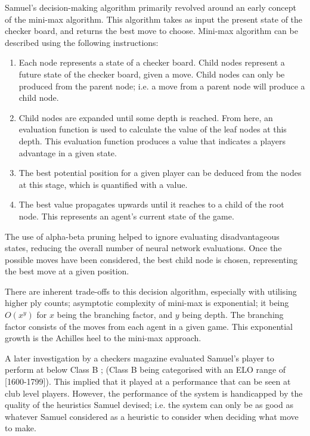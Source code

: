 \documentclass[12pt,a4paper]{article}
\begin{document}
        Samuel's decision-making algorithm primarily revolved around an early concept of the mini-max algorithm. This algorithm takes as input the present state of the checker board, and returns the best move to choose. Mini-max algorithm can be described using the following instructions:
        
        \begin{enumerate}
            \item Each node represents a state of a checker board. Child nodes represent a future state of the checker board, given a move. Child nodes can only be produced from the parent node; i.e. a move from a parent node will produce a child node.
            \item Child nodes are expanded until some depth is reached. From here, an evaluation function is used to calculate the value of the leaf nodes at this depth. This evaluation function produces a value that indicates a players advantage in a given state.
            \item The best potential position for a given player can be deduced from the nodes at this stage, which is quantified with a value.
            \item The best value propagates upwards until it reaches to a child of the root node. This represents an agent's current state of the game.
        \end{enumerate}

        The use of alpha-beta pruning helped to ignore evaluating disadvantageous states, reducing the overall number of neural network evaluations. Once the possible moves have been considered, the best child node is chosen, representing the best move at a given position.
    
        There are inherent trade-offs to this decision algorithm, especially with utilising higher ply counts; asymptotic complexity of mini-max is exponential; it being $O(x^y)$ for $x$ being the branching factor, and $y$ being depth. The branching factor consists of the moves from each agent in a given game. This exponential growth is the Achilles heel to the mini-max approach. 

        A later investigation by a checkers magazine evaluated Samuel's player to perform at below Class B \cite{schaeffer_one_1997,fogel_evolving_2000}; (Class B being categorised with an ELO range of [1600-1799]). This implied that it played at a performance that can be seen at club level players. However, the performance of the system is handicapped by the quality of the heuristics Samuel devised; i.e. the system can only be as good as whatever Samuel considered as a heuristic to consider when deciding what move to make.
\end{document}
